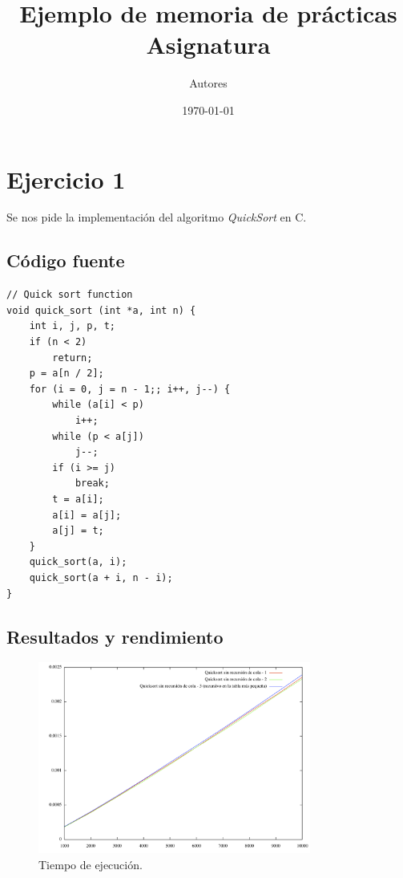 \documentclass[12pt,a4paper,titlepage]{article}
\author{Autores}
\date{\today}
\title{Ejemplo de memoria de prácticas \\ {\large Asignatura}}
\begin{document}
\maketitle

\pagestyle{plain} %

\tableofcontents
\newpage

\section{Ejercicio 1}

Se nos pide la implementación del algoritmo \textit{QuickSort} en C.

\subsection{Código fuente}

\begin{lstlisting}
// Quick sort function
void quick_sort (int *a, int n) {
    int i, j, p, t;
    if (n < 2)
        return;
    p = a[n / 2];
    for (i = 0, j = n - 1;; i++, j--) {
        while (a[i] < p)
            i++;
        while (p < a[j])
            j--;
        if (i >= j)
            break;
        t = a[i];
        a[i] = a[j];
        a[j] = t;
    }
    quick_sort(a, i);
    quick_sort(a + i, n - i);
}
\end{lstlisting}


\subsection{Resultados y rendimiento}

\begin{figure}[hbtp]
\centering
\includegraphics[width = 0.8\textwidth]{Grafica.png}
\caption{Tiempo de ejecución.}
\label{fig:TiempoEjecucion}
\end{figure}
\end{document}
